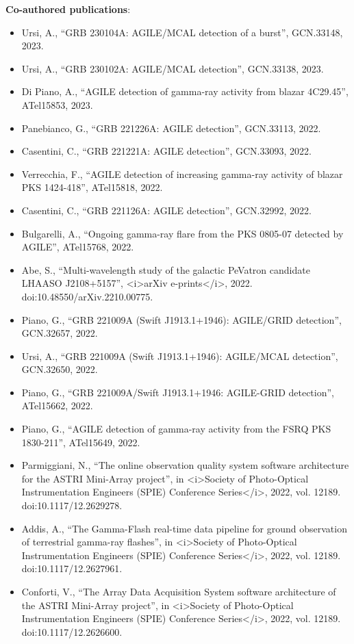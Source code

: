 \textbf{Co-authored publications}:
\begin{itemize}
\item Ursi, A., “GRB 230104A: AGILE/MCAL detection of a burst”, GCN.33148, 2023.
\item Ursi, A., “GRB 230102A: AGILE/MCAL detection”, GCN.33138, 2023.
\item Di Piano, A., “AGILE detection of gamma-ray activity from blazar 4C29.45”, ATel15853, 2023.
\item Panebianco, G., “GRB 221226A: AGILE detection”, GCN.33113, 2022.
\item Casentini, C., “GRB 221221A: AGILE detection”, GCN.33093, 2022.
\item Verrecchia, F., “AGILE detection of increasing gamma-ray activity of blazar PKS 1424-418”, ATel15818, 2022.
\item Casentini, C., “GRB 221126A: AGILE detection”, GCN.32992, 2022.
\item Bulgarelli, A., “Ongoing gamma-ray flare from the PKS 0805-07 detected by AGILE”, ATel15768, 2022.
\item Abe, S., “Multi-wavelength study of the galactic PeVatron candidate LHAASO J2108+5157”, <i>arXiv e-prints</i>, 2022. doi:10.48550/arXiv.2210.00775.
\item Piano, G., “GRB 221009A (Swift J1913.1+1946): AGILE/GRID detection”, GCN.32657, 2022.
\item Ursi, A., “GRB 221009A (Swift J1913.1+1946): AGILE/MCAL detection”, GCN.32650, 2022.
\item Piano, G., “GRB 221009A/Swift J1913.1+1946: AGILE-GRID detection”, ATel15662, 2022.
\item Piano, G., “AGILE detection of gamma-ray activity from the FSRQ PKS 1830-211”, ATel15649, 2022.
\item Parmiggiani, N., “The online observation quality system software architecture for the ASTRI Mini-Array project”, in <i>Society of Photo-Optical Instrumentation Engineers (SPIE) Conference Series</i>, 2022, vol. 12189. doi:10.1117/12.2629278.
\item Addis, A., “The Gamma-Flash real-time data pipeline for ground observation of terrestrial gamma-ray flashes”, in <i>Society of Photo-Optical Instrumentation Engineers (SPIE) Conference Series</i>, 2022, vol. 12189. doi:10.1117/12.2627961.
\item Conforti, V., “The Array Data Acquisition System software architecture of the ASTRI Mini-Array project”, in <i>Society of Photo-Optical Instrumentation Engineers (SPIE) Conference Series</i>, 2022, vol. 12189. doi:10.1117/12.2626600.

\end{itemize}
